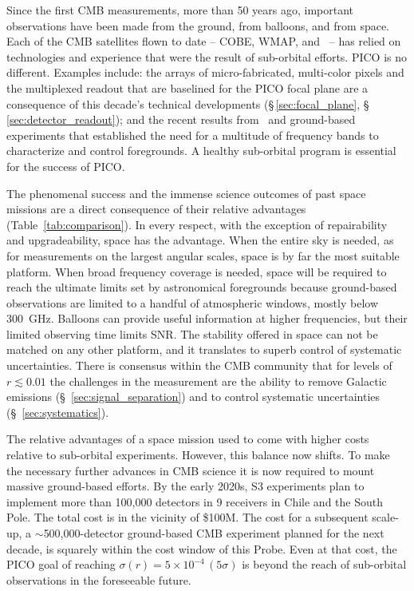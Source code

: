 \documentclass[PICOReport.tex]{subfiles}
\begin{document}
Since the first \ac{CMB} measurements, more than 50 years ago, important observations have been made from the ground, from balloons, and from space. Each of the CMB satellites flown to date -- COBE, WMAP, and \planck\ -- has relied on technologies and experience that were the result of sub-orbital efforts. PICO is no different. Examples include: the arrays of micro-fabricated, multi-color pixels and the multiplexed readout that are baselined for the PICO focal plane are a consequence of this decade's technical developments (\S\,\ref{sec:focal_plane}, \S\,\ref{sec:detector_readout}); and the recent results from \planck \ and ground-based experiments that established the need for a multitude of frequency bands to characterize and control foregrounds.  A healthy sub-orbital program is essential for the success of PICO. 


The phenomenal success and the immense science outcomes of past space missions are a direct consequence of their relative advantages (Table~\ref{tab:comparison}). In every respect, with the exception of repairability and upgradeability, space has the advantage. When the entire sky is needed, as for measurements on the largest angular scales, space is by far the most suitable platform.  When broad frequency coverage is needed, space will be required to reach the ultimate limits set by astronomical foregrounds because ground-based observations are limited to a handful of atmospheric windows, mostly below 300~GHz. Balloons can provide useful information at higher frequencies, but their limited observing time limits \ac{SNR}. The stability offered in space can not be matched on any other platform, and it translates to superb control of systematic uncertainties. There is consensus within the CMB community that for levels of $r \lesssim 0.01$ the challenges in the measurement are the ability to remove Galactic emissions (\S~\ref{sec:signal_separation}) and to control systematic uncertainties (\S~\ref{sec:systematics}). 

The relative advantages of a space mission used to come with higher costs relative to sub-orbital experiments. However, this balance now shifts. To make the necessary further advances in CMB science it is now required to mount massive ground-based efforts.  By the early 2020s, S3 experiments plan to implement more than 100,000 detectors in 9 receivers in Chile and the South Pole. The total cost is in the vicinity of \$100M. The cost for a subsequent scale-up, a $\sim$500,000-detector ground-based CMB experiment planned for the next decade, is squarely within the cost window of this Probe. Even at that cost, the PICO goal of reaching $\sigma(r) = 5 \times 10^{-4}\,(5 \sigma) $ is beyond the reach of sub-orbital observations in the foreseeable future.  
\end{document}
